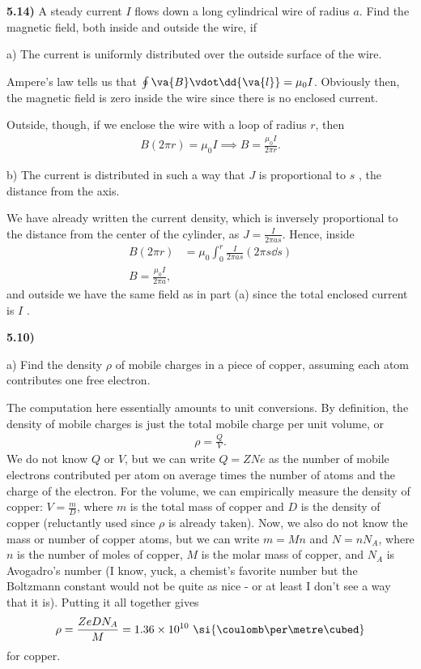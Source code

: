 \documentclass[12pt,a4paper]{article}
\newcommand{\prob}[2]{\textbf{#1)} #2}
\begin{document}
\prob{5.14}{A steady current $I$ flows down a long cylindrical wire of radius $a$. Find the magnetic field, both inside and outside the wire, if}

a) The current is uniformly distributed over the outside surface of the wire.

Ampere's law tells us that $\oint \va{B} \vdot \dd{\va{l}} = \mu_0 I$.
Obviously then, the magnetic field is zero inside the wire since there is no enclosed current.

Outside, though, if we enclose the wire with a loop of radius $r$, then
\begin{align*}
    B(2 \pi r) = \mu_0 I \implies B = \frac{\mu_0 I}{2 \pi r}
.\end{align*}

b) The current is distributed in such a way that $J$ is proportional to $s$ , the distance from the axis.

We have already written the current density, which is inversely proportional to the distance from the center of the cylinder, as $J = \frac{I}{2 \pi a s}$.
Hence, inside
\begin{align*}
    B(2 \pi r) &= \mu_0 \int_{0}^{r} \frac{I}{2 \pi a s} \left( 2 \pi s \dd{s} \right) \\
    B = \frac{\mu_0 I }{2 \pi a}
,\end{align*}
and outside we have the same field as in part (a) since the total enclosed current is $I$ .

\prob{5.10}{}

a) Find the density $\rho$ of mobile charges in a piece of copper, assuming each atom contributes one free electron.

The computation here essentially amounts to unit conversions.
By definition, the density of mobile charges is just the total mobile charge per unit volume, or
\begin{align*}
    \rho = \frac{Q}{V}
.\end{align*}
We do not know $Q$ or $V$, but we can write $Q = ZNe$ as the number of mobile electrons contributed per atom on average times the number of atoms and the charge of the electron.
For the volume, we can empirically measure the density of copper: $V = \frac{m}{D}$, where $m$ is the total mass of copper and $D$ is the density of copper (reluctantly used since $\rho$ is already taken).
Now, we also do not know the mass or number of copper atoms, but we can write $m = M n$ and $N = n N_{A}$, where $n$ is the number of moles of copper, $M$ is the molar mass of copper, and $N_{A}$ is Avogadro's number (I know, yuck, a chemist's favorite number but the Boltzmann constant would not be quite as nice - or at least I don't see a way that it is).
Putting it all together gives
\begin{align*}
    \rho = \frac{ZeDN_{A}}{M} = 1.36 \times 10^{10} \text{ \si{\coulomb\per\metre\cubed}}
\end{align*}
for copper.
\end{document}

